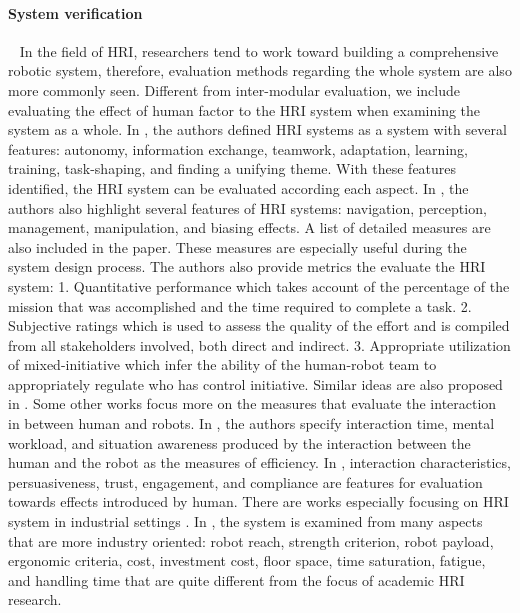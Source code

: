 \paragraph{System verification}~
In the field of HRI, researchers tend to work toward building a comprehensive robotic system, therefore, evaluation methods regarding the whole system are also more commonly seen. Different from inter-modular evaluation, we include evaluating the effect of human factor to the HRI system when examining the system as a whole.  In \cite{goodrich2008human}, the authors defined HRI systems as a system with several features: autonomy, information exchange, teamwork, adaptation, learning, training, task-shaping, and finding a unifying theme. With these features identified, the HRI system can be evaluated according each aspect. In \cite{steinfeld2006common}, the authors also highlight several features of HRI systems: navigation, perception, management, manipulation, and biasing effects. A list of detailed measures are also included in the paper. These measures are especially useful during the system design process. The authors also provide metrics the evaluate the HRI system: 1. Quantitative performance which takes account of the percentage of the mission that was accomplished and the time required to complete a task. 2. Subjective ratings which is used to assess the quality of the effort and is compiled from all stakeholders involved, both direct and indirect. 3. Appropriate utilization of mixed-initiative which infer the ability of the human-robot team to appropriately regulate who has control initiative. Similar ideas are also proposed in \cite{burke2004final,murphy2013survey}. Some other works focus more on the measures that evaluate the interaction in between human and robots. In \cite{goodrich2008human}, the authors specify interaction time, mental workload, and situation awareness produced by the interaction between the human and the robot as the measures of efficiency. In \cite{steinfeld2006common}, interaction characteristics, persuasiveness, trust, engagement, and compliance are features for evaluation towards effects introduced by human. There are works especially focusing on HRI system in industrial settings \cite{michalos2018method,takata2011human,chen2011assembly}. In \cite{michalos2018method}, the system is examined from many aspects that are more industry oriented: robot reach, strength criterion, robot payload, ergonomic criteria, cost, investment cost, floor space, time saturation, fatigue, and handling time that are quite different from the focus of academic HRI research.

